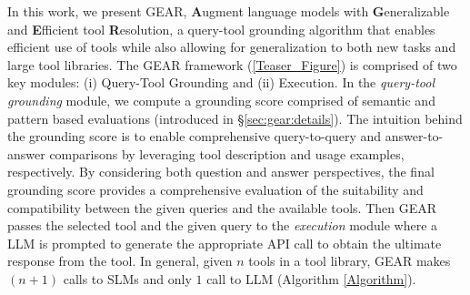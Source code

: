 \documentclass[11pt]{article}
\newcommand{\daniel}[1]{{\color{purple}[DK: #1]}}
\newcommand{\danielchange}[2]{{\color{red}{\st{#1}}{#2}}}
\newcommand{\yining}[1]{{\color{ForestGreen}[YL: #1]}}
\newcommand{\yiningchange}[2]{{\color{ForestGreen}{\st{#1}}{#2}}}
\newcommand{\llm}{\textcolor{darkredTwo}{LLM}}
\newcommand{\slm}{\textcolor{darkblueTwo}{SLM}}
\newcommand{\name}{{\fontfamily{cmss}\selectfont GEAR}}
\begin{document}
In this work, we present \name, \textbf{A}ugment language models with \textbf{G}eneralizable and \textbf{E}fficient tool \textbf{R}esolution, a query-tool grounding algorithm that enables efficient use of tools while also allowing for generalization to both new tasks and large tool libraries. 
The \name{} framework (\autoref{Teaser_Figure}) is comprised of two key modules: (i) Query-Tool Grounding and (ii) Execution. In the \emph{query-tool grounding} module, we compute a grounding score comprised of semantic and pattern based evaluations (introduced in \S\ref{sec:gear:details}). The intuition behind the grounding score is to enable comprehensive query-to-query and answer-to-answer comparisons by leveraging tool description and usage examples, respectively. By considering both question and answer perspectives, the final grounding score provides a comprehensive evaluation of the suitability and compatibility between the given queries and the available tools. Then \name{} passes the selected tool and the given query to the 
\emph{execution} module where a \llm{} is prompted to generate the appropriate API call to obtain the ultimate response from the tool. In general, given $n$ tools in a tool library, \name{} makes $(n+1)$ calls to \slm{}s and only $1$ call to \llm{} (Algorithm \ref{Algorithm}).
\end{document}
